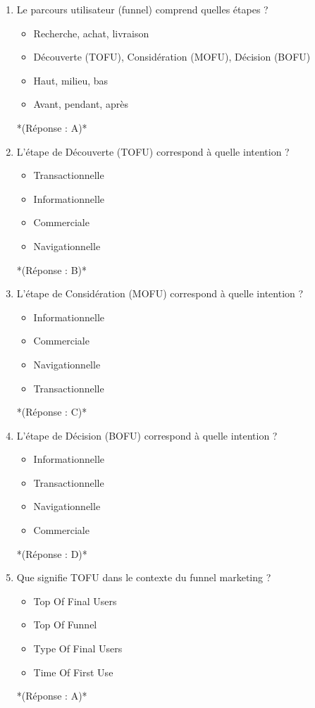 \documentclass[12pt,a4paper,twoside]{report}
\begin{document}
\begin{enumerate}
\item Le parcours utilisateur (funnel) comprend quelles étapes ?
\begin{itemize}
\item[A)] Recherche, achat, livraison
\item[B)] Découverte (TOFU), Considération (MOFU), Décision (BOFU)
\item[C)] Haut, milieu, bas
\item[D)] Avant, pendant, après
\end{itemize}
*(Réponse : A)*

\item L'étape de Découverte (TOFU) correspond à quelle intention ?
\begin{itemize}
\item[A)] Transactionnelle
\item[B)] Informationnelle
\item[C)] Commerciale
\item[D)] Navigationnelle
\end{itemize}
*(Réponse : B)*

\item L'étape de Considération (MOFU) correspond à quelle intention ?
\begin{itemize}
\item[A)] Informationnelle
\item[B)] Commerciale
\item[C)] Navigationnelle
\item[D)] Transactionnelle
\end{itemize}
*(Réponse : C)*

\item L'étape de Décision (BOFU) correspond à quelle intention ?
\begin{itemize}
\item[A)] Informationnelle
\item[B)] Transactionnelle
\item[C)] Navigationnelle
\item[D)] Commerciale
\end{itemize}
*(Réponse : D)*

\item Que signifie TOFU dans le contexte du funnel marketing ?
\begin{itemize}
\item[A)] Top Of Final Users
\item[B)] Top Of Funnel
\item[C)] Type Of Final Users
\item[D)] Time Of First Use
\end{itemize}
*(Réponse : A)*


\end{enumerate}
\end{document}
